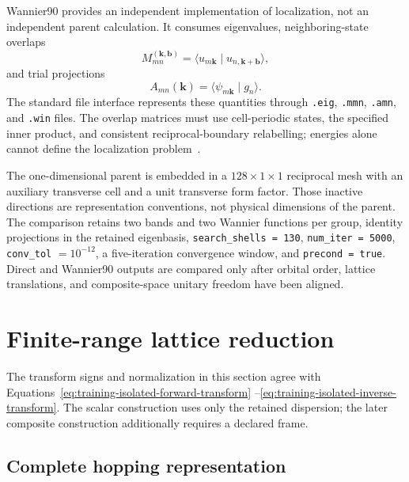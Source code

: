 Wannier90 provides an independent implementation of localization, not an
independent parent calculation. It consumes eigenvalues, neighboring-state
overlaps
\begin{equation}
    M_{mn}^{(\mathbf k,\mathbf b)}
    =
    \langle u_{m\mathbf k}\mid u_{n,\mathbf k+\mathbf b}\rangle,
\end{equation}
and trial projections
\begin{equation}
    A_{mn}(\mathbf k)
    =\langle\psi_{m\mathbf k}\mid g_n\rangle.
\end{equation}
The standard file interface represents these quantities through
\texttt{.eig}, \texttt{.mmn}, \texttt{.amn}, and \texttt{.win} files. The
overlap matrices must use cell-periodic states, the specified inner product, and
consistent reciprocal-boundary relabelling; energies alone cannot define the
localization problem~\cite{souza2001,pizzi2020}.

The one-dimensional parent is embedded in a $128\times1\times1$ reciprocal
mesh with an auxiliary transverse cell and a unit transverse form factor. Those
inactive directions are representation conventions, not physical dimensions
of the parent. The comparison retains two bands and two Wannier functions per group, identity
projections in the retained eigenbasis,
\texttt{search\_shells = 130}, \texttt{num\_iter = 5000},
\texttt{conv\_tol} $=10^{-12}$, a five-iteration convergence window, and
\texttt{precond = true}. Direct and Wannier90 outputs are compared only after
orbital order, lattice translations, and composite-space unitary freedom have
been aligned.

\section{Finite-range lattice reduction}

The transform signs and normalization in this section agree with
Equations~\eqref{eq:training-isolated-forward-transform}
--\eqref{eq:training-isolated-inverse-transform}. The scalar construction uses
only the retained dispersion; the later composite construction additionally
requires a declared frame.

\subsection{Complete hopping representation}

